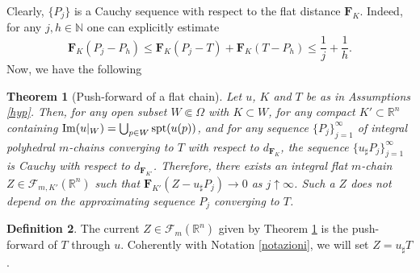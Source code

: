 \documentclass[a4paper,11pt,reqno]{amsart}
\newtheorem{theorem}{Theorem}[section]
\theoremstyle{definition}
\newtheorem{definition}[theorem]{Definition}
\numberwithin{equation}{section}
\numberwithin{subsection}{section}
\newcommand{\N}{\mathbb{N}}
\newcommand{\R}{\mathbb{R}}
\newcommand{\Fl}{\mathbf{F}}
\newcommand{\F}{\mathscr{F}}
\newcommand{\spt}{\mathrm{spt}}
\begin{document}
Clearly, $\{ P_{j} \}$ is a Cauchy sequence with respect to the flat distance $\Fl_{K}$. Indeed, for any $j,h \in \N$ one can explicitly estimate
\begin{equation} \label{pf_fc:4bis}
\Fl_{K}(P_{j} - P_{h}) \leq \Fl_{K}(P_{j} - T) + \Fl_{K}(T - P_{h}) \leq \frac{1}{j} + \frac{1}{h}.
\end{equation}
Now, we have the following
\begin{theorem}[Push-forward of a flat chain] \label{pf_fc:thm}
Let $u$, $K$ and $T$ be as in Assumptions \ref{hyp}. Then, for any open subset $W \Subset \Omega$ with $K \subset W$, for any compact $K' \subset \R^{n}$ containing ${\rm Im}(u|_{W}) = \bigcup_{p \in W} \spt(u(p))$, and for any sequence $\lbrace P_{j} \rbrace_{j=1}^{\infty}$ of integral polyhedral $m$-chains converging to $T$ with respect to $d_{\Fl_{K}}$, the sequence $\{ u_{\sharp}P_{j} \}_{j=1}^{\infty}$ is Cauchy with respect to $d_{\Fl_{K'}}$. Therefore, there exists an integral flat $m$-chain $Z \in \F_{m,K'}(\R^{n})$ such that $\Fl_{K'}(Z - u_{\sharp}P_{j}) \to 0$ as $j \uparrow \infty$. Such a $Z$ does not depend on the approximating sequence $P_{j}$ converging to $T$.
\end{theorem}

\begin{definition}
The current $Z \in \F_{m}(\R^{n})$ given by Theorem \ref{pf_fc:thm} is the push-forward of $T$ through $u$. Coherently with Notation \ref{notazioni}, we will set $Z = u_{\sharp}T$.
\end{definition}
\end{document}
